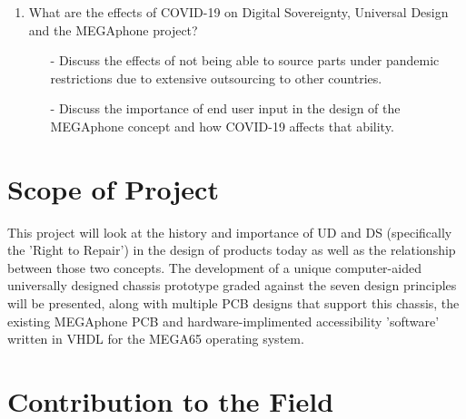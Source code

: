 \begin{enumerate}
\begin{enumerate}
        \end{enumerate} 
    \item What are the effects of COVID-19 on Digital Sovereignty, Universal Design and the MEGAphone project? %
        \begin{enumerate}
        \item[-] Discuss the effects of not being able to source parts under pandemic restrictions due to extensive outsourcing to other countries.
        \item[-] Discuss the importance of end user input in the design of the MEGAphone concept and how COVID-19 affects that ability.
        \end{enumerate} 
\end{enumerate}

\section{Scope of Project}

This project will look at the history and importance of UD and DS (specifically the 'Right to Repair') in the design of products today as well as the relationship between those two concepts.
The development of a unique computer-aided universally designed chassis prototype graded against the seven design principles \cite{sevenprinciples} will be presented, along with multiple PCB designs that support this chassis, the existing MEGAphone PCB and hardware-implimented accessibility 'software' written in VHDL for the MEGA65 operating system.

\section{Contribution to the Field} %

